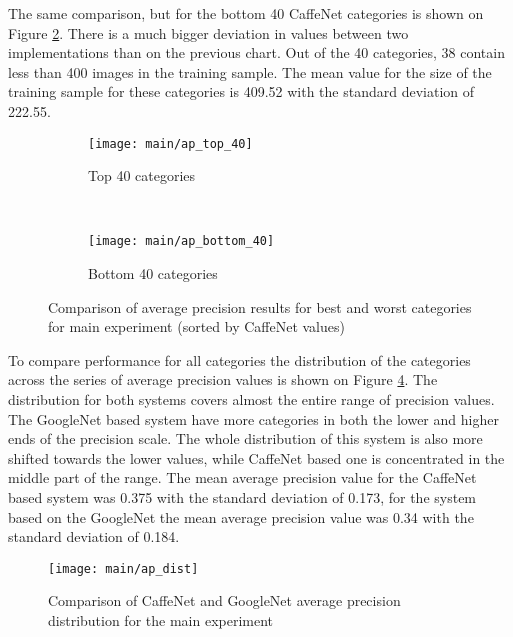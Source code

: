     The same comparison, but for the bottom 40 CaffeNet categories is shown on Figure \ref{fig:main-ap-bottom-40}. There is a much bigger deviation in values between two implementations than on the previous chart. Out of the 40 categories, 38 contain less than 400 images in the training sample. The mean value for the size of the training sample for these categories is 409.52 with the standard deviation of 222.55.  %
    
    
    \begin{figure}[H]
        \centering
        \begin{subfigure}[a]{0.95\textwidth}
            \texttt{[image: main/ap\_top\_40]}
            \caption{Top 40 categories}
            \label{fig:main-ap-top-40}
        \end{subfigure}
        \\
        \begin{subfigure}[a]{0.95\textwidth}
            \texttt{[image: main/ap\_bottom\_40]}
            \caption{Bottom 40 categories}
            \label{fig:main-ap-bottom-40}
        \end{subfigure}
        \caption{Comparison of average precision results for best and worst categories for main experiment (sorted by CaffeNet values)}
        \label{fig:main-ap}
    \end{figure}
    
    To compare performance for all categories the distribution of the categories across the series of average precision values is shown on Figure \ref{fig:main-ap-dist}. The distribution for both systems covers almost the entire range of precision values. The GoogleNet based system have more categories in both the lower and higher ends of the precision scale. The whole distribution of this system is also more shifted towards the lower values, while CaffeNet based one is concentrated in the middle part of the range. The mean average precision value for the CaffeNet based system was 0.375 with the standard deviation of 0.173, for the system based on the GoogleNet the mean average precision value was 0.34 with the standard deviation of 0.184.
    
    \begin{figure}[H]
        \centering
        \texttt{[image: main/ap\_dist]}
        \caption{Comparison of CaffeNet and GoogleNet average precision distribution for the main experiment}
        \label{fig:main-ap-dist}
    \end{figure}
    
